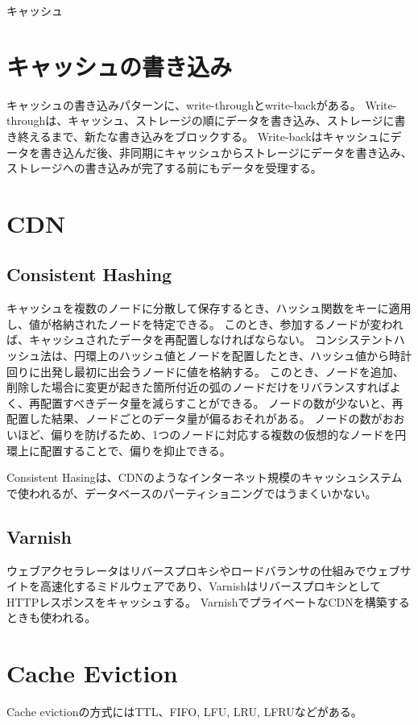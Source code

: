 \documentclass[book]{jlreq}
\begin{document}
\begin{chapter-bib}{キャッシュ}
  \section{キャッシュの書き込み}
  キャッシュの書き込みパターンに、write-throughとwrite-backがある\cite{sasp}。
  Write-throughは、キャッシュ、ストレージの順にデータを書き込み、ストレージに書き終えるまで、新たな書き込みをブロックする。
  Write-backはキャッシュにデータを書き込んだ後、非同期にキャッシュからストレージにデータを書き込み、ストレージへの書き込みが完了する前にもデータを受理する。
  
  \section{CDN}
  \subsection{Consistent Hashing}
  キャッシュを複数のノードに分散して保存するとき、ハッシュ関数をキーに適用し、値が格納されたノードを特定できる。
  このとき、参加するノードが変われば、キャッシュされたデータを再配置しなければならない。
  コンシステントハッシュ法は、円環上のハッシュ値とノードを配置したとき、ハッシュ値から時計回りに出発し最初に出会うノードに値を格納する\cite{sdi}。
  このとき、ノードを追加、削除した場合に変更が起きた箇所付近の弧のノードだけをリバランスすればよく、再配置すべきデータ量を減らすことができる。
  ノードの数が少ないと、再配置した結果、ノードごとのデータ量が偏るおそれがある。
  ノードの数がおおいほど、偏りを防げるため、1つのノードに対応する複数の仮想的なノードを円環上に配置することで、偏りを抑止できる。
  
  Consistent Hasingは、CDNのようなインターネット規模のキャッシュシステムで使われるが、データベースのパーティショニングではうまくいかない\cite{DBLP:journals/corr/LampingV14}。
  \subsection{Varnish}
  ウェブアクセラレータはリバースプロキシやロードバランサの仕組みでウェブサイトを高速化するミドルウェアであり、VarnishはリバースプロキシとしてHTTPレスポンスをキャッシュする\cite{varnish,webaccel}。
  VarnishでプライベートなCDNを構築するときも使われる\cite{varnish-private-cdn}。
  \section{Cache Eviction}
  Cache evictionの方式にはTTL、FIFO, LFU, LRU, LFRUなどがある\cite{lc-cache}。
\end{chapter-bib}
\end{document}
